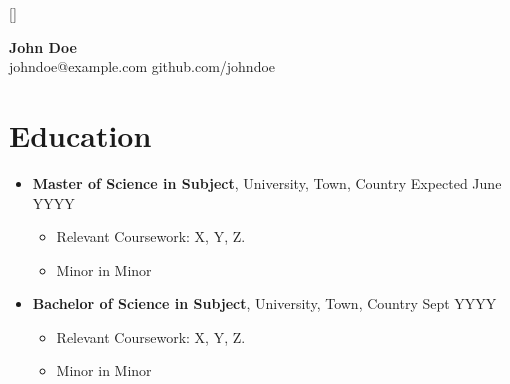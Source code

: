 \documentclass[12pt,a4paper]{article}
\begin{document}
\titleformat{\section}{\large\bf}{}{0cm}{}[\titlerule\vspace{-0.5em}]

\begin{center}
{\Huge\textbf{John Doe}} \\[.8em]
johndoe@example.com \hspace{2em} github.com/johndoe
\end{center}

\section{Education}
\begin{itemize}[leftmargin=0cm, topsep=-2em, itemsep=-0.0em, label={}]
\item \textbf{Master of Science in Subject}, University, Town, Country \hfill Expected June YYYY
\begin{itemize}[leftmargin=*, topsep=-2em, itemsep=-0.7em, label=\textbullet]
\item Relevant Coursework: X, Y, Z.
\item Minor in Minor
\end{itemize}
\item \textbf{Bachelor of Science in Subject}, University, Town, Country \hfill Sept YYYY
\begin{itemize}[leftmargin=*, topsep=-2em, itemsep=-0.7em, label=\textbullet]
\item Relevant Coursework: X, Y, Z.
\item Minor in Minor
\end{itemize}
\end{itemize}
\end{document}
